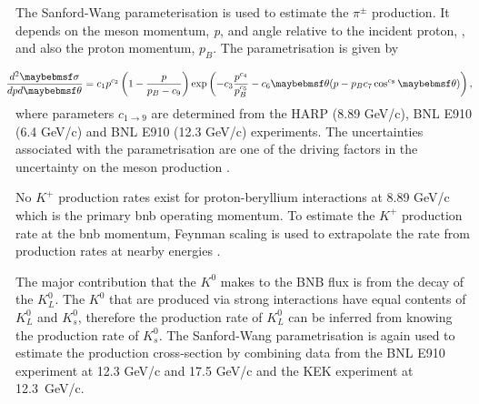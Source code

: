The Sanford-Wang parameterisation is used to estimate the $\pi^{\pm}$ production. It depends on the meson momentum, \textit{p}, and angle relative to the incident proton, \textit{\theta}, and also the proton momentum, $p_B$. The parametrisation is given by

\begin{equation}
  \hspace{-0.35cm}
  \label{eq:SW}
  \frac{d^{2}\sigma}{dpd\theta} = 
  c_{1}p^{c_{2}} 
  \left( 1 - \frac{p}{p_{B} -c_{9}} \right)
  \exp \left( -c_{3} \frac{p^{c_{4}}}{p_{B}^{c_{5}}} - c_{6}\theta(p - p_{B}c_{7}\cos^{c_{8}}{\theta}) \right),
\end{equation}
where parameters $c_{1 \rightarrow 9}$ are determined from the HARP (8.89 GeV/c), BNL E910 (6.4 GeV/c) and BNL E910 (12.3 GeV/c) experiments. The uncertainties associated with the parametrisation are one of the driving factors in the uncertainty on the meson production \cite{BNB_flux}.

No $K^+$ production rates exist for proton-beryllium interactions at 8.89 GeV/c which is the primary \gls{bnb} operating momentum. To estimate the $K^+$ production rate at the \gls{bnb} momentum, Feynman scaling is used to extrapolate the rate from production rates at nearby energies \cite{BNB_flux}.

The major contribution that the $K^0$ makes to the BNB flux is from the decay of the $K^0_L$. The $K^0$ that are produced via strong interactions have equal contents of $K^0_L$ and $K^0_s$, therefore the production rate of $K^0_L$ can be inferred from knowing the production rate of $K^0_s$. The Sanford-Wang parametrisation is again used to estimate the production cross-section by combining data from the BNL E910 experiment at 12.3 GeV/c and 17.5 GeV/c and the KEK experiment at \mbox{12.3 GeV/c}.

